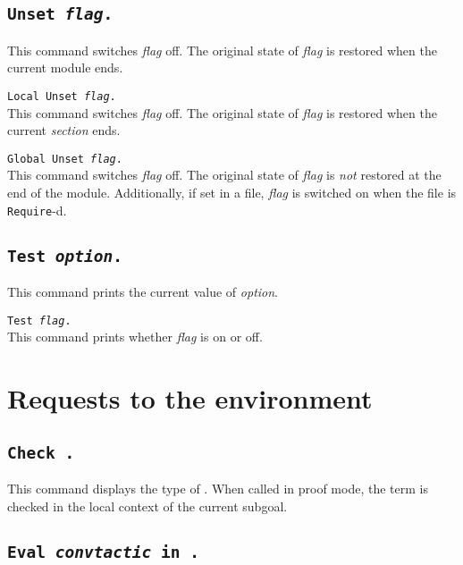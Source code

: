 \subsection[\tt Unset {\rm\sl flag}.]{\tt Unset {\rm\sl flag}.}
This command switches {\rm\sl flag} off. The original state of {\rm\sl flag}
is restored when the current module ends.

\begin{Variants}
\item {\tt Local Unset {\rm\sl flag}.}\\
This command switches {\rm\sl flag} off. The original state of {\rm\sl flag}
is restored when the current \emph{section} ends.
\item {\tt Global Unset {\rm\sl flag}.}\\
This command switches {\rm\sl flag} off.  The original state of
{\rm\sl flag} is \emph{not} restored at the end of the module. Additionally,
if set in a file, {\rm\sl flag} is switched on when the file is
{\tt Require}-d.
\end{Variants}

\subsection[\tt Test {\rm\sl option}.]{\tt Test {\rm\sl option}.}
This command prints the current value of {\rm\sl option}.

\begin{Variants}
\item {\tt Test {\rm\sl flag}.}\\
This command prints whether {\rm\sl flag} is on or off.
\end{Variants}

\section{Requests to the environment}

\subsection[\tt Check {\term}.]{\tt Check {\term}.\label{Check}
}
This command displays the type of {\term}. When called in proof mode, 
the term is checked in the local context of the current subgoal.

\subsection[\tt Eval {\rm\sl convtactic} in {\term}.]{\tt Eval {\rm\sl convtactic} in {\term}.}

